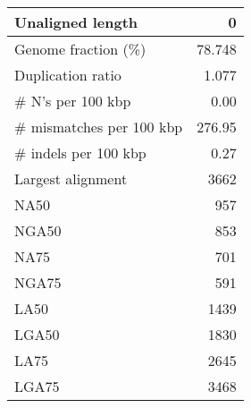 \documentclass[12pt,a4paper]{article}
\begin{document}
\begin{table}[ht]
\begin{center}
\begin{tabular}{|l*{1}{|r}|}
Unaligned length & 0 \\ \hline
Genome fraction (\%) & 78.748 \\ \hline
Duplication ratio & 1.077 \\ \hline
\# N's per 100 kbp & 0.00 \\ \hline
\# mismatches per 100 kbp & 276.95 \\ \hline
\# indels per 100 kbp & 0.27 \\ \hline
Largest alignment & 3662 \\ \hline
NA50 & 957 \\ \hline
NGA50 & 853 \\ \hline
NA75 & 701 \\ \hline
NGA75 & 591 \\ \hline
LA50 & 1439 \\ \hline
LGA50 & 1830 \\ \hline
LA75 & 2645 \\ \hline
LGA75 & 3468 \\ \hline
\end{tabular}
\end{center}
\end{table}
\end{document}
